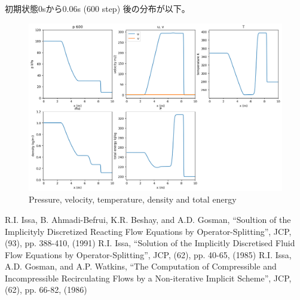 \documentclass[a4paper,10pt,fleqn,dvipdfmx]{jsarticle}
\begin{document}
初期状態0sから0.06s (600 step) 後の分布が以下。
\begin{figure}[htbp]
 \centering
 \includegraphics[scale=0.5]{plots_uvTp600.png}
\caption{Pressure, velocity, temperature, density and total energy}
\end{figure}

\begin{thebibliography}{99}
 R.I. Issa, B. Ahmadi-Befrui, K.R. Beshay, and
        A.D. Gosman, ``Soultion of the Implicityly Discretized Reacting
        Flow Equations by Operator-Splitting'', JCP, (93), pp. 388-410, (1991)
 R.I. Issa, ``Solution of the Implicitly Discretised
        Fluid Flow Equations by Operator-Splitting'', JCP, (62),
        pp. 40-65, (1985)
 R.I. Issa, A.D. Gosman, and A.P. Watkins, ``The
        Computation of Compressible and Incompressible Recirculating
        Flows by a Non-iterative Implicit Scheme'', JCP, (62),
        pp. 66-82, (1986)
\end{thebibliography}
\end{document}
